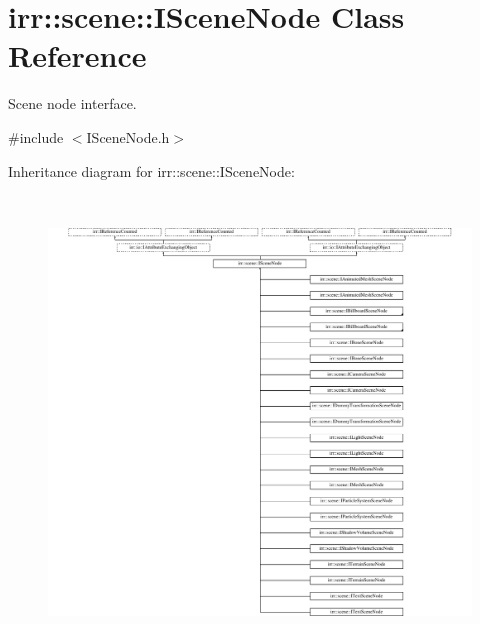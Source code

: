\hypertarget{classirr_1_1scene_1_1ISceneNode}{}\section{irr\+:\+:scene\+:\+:I\+Scene\+Node Class Reference}
\label{classirr_1_1scene_1_1ISceneNode}


Scene node interface.  




{\ttfamily \#include $<$I\+Scene\+Node.\+h$>$}

Inheritance diagram for irr\+:\+:scene\+:\+:I\+Scene\+Node\+:\begin{figure}[H]
\begin{center}
\leavevmode
\includegraphics[height=12.000000cm]{classirr_1_1scene_1_1ISceneNode}
\end{center}
\end{figure}
